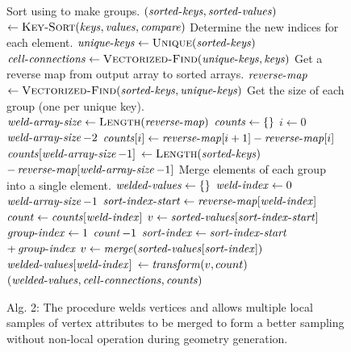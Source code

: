 \documentclass[10pt,journal,cspaper,compsoc]{IEEEtran}
\begin{document}
\noindent
\begin{figure}
\vspace{-.32cm}
\begin{codebox}
  \zi \Comment Sort  using  to make groups.
  \li $(\id{sorted-keys},\id{sorted-values})$
  \zi \>\> $\gets \proc{Key-Sort}(\id{keys},\id{values},\id{compare})$
  \zi \Comment Determine the new indices for each element.
  \li $\id{unique-keys} \gets \proc{Unique}(\id{sorted-keys})$
  \li $\id{cell-connections} \gets \proc{Vectorized-Find}(\id{unique-keys},\id{keys})$
  \zi \Comment Get a reverse map from output array to sorted arrays.
  \li $\id{reverse-map}$
  \zi \>\> $\gets \proc{Vectorized-Find}(\id{sorted-keys},\id{unique-keys})$
  \zi \Comment Get the size of each group (one per unique key).
  \li $\id{weld-array-size} \gets \proc{Length}(\id{reverse-map})$
  \li $\id{counts} \gets \{ \}$
  \li \For $i \gets 0$ \To $\id{weld-array-size} - 2$
  \zi \Do {}
  \li     $\id{counts}[i] \gets \id{reverse-map}[i+1] - \id{reverse-map}[i]$
      \End
  \li $\id{counts}[\id{weld-array-size}-1]$
  \zi \>\> $\gets \proc{Length}(\id{sorted-keys})$
  \zi \>\>\> $ - \id{reverse-map}[\id{weld-array-size}-1]$
  \zi \Comment Merge elements of each group into a single element.
  \li $\id{welded-values} \gets \{ \}$
  \li \For $\id{weld-index} \gets 0$ \To $\id{weld-array-size} - 1$
  \zi \Do {}
  \li     $\id{sort-index-start} \gets \id{reverse-map}[\id{weld-index}]$
  \li     $\id{count} \gets \id{counts}[\id{weld-index}]$
  \li     $v \gets \id{sorted-values}[\id{sort-index-start}]$
  \li     \For $\id{group-index} \gets 1$ \To $\id{count} - 1$
  \zi     \Do
  \li         $\id{sort-index} \gets \id{sort-index-start}$
  \zi         \>\>\>\> $+ \id{group-index}$
  \li         $v \gets \id{merge}(\id{sorted-values}[\id{sort-index}])$
          \End
  \li     $\id{welded-values}[\id{weld-index}]$
  \zi     \>\> $\gets \id{transform}(v, count)$
      \End
  \li \Return $(\id{welded-values}, \id{cell-connections}, \id{counts})$
\end{codebox}
\vspace{-0.47cm}
\caption*{Alg. 2: The  procedure welds vertices and allows multiple local samples of vertex attributes to be merged to form a better sampling without non-local operation during geometry generation.}
\end{figure}
\end{document}
